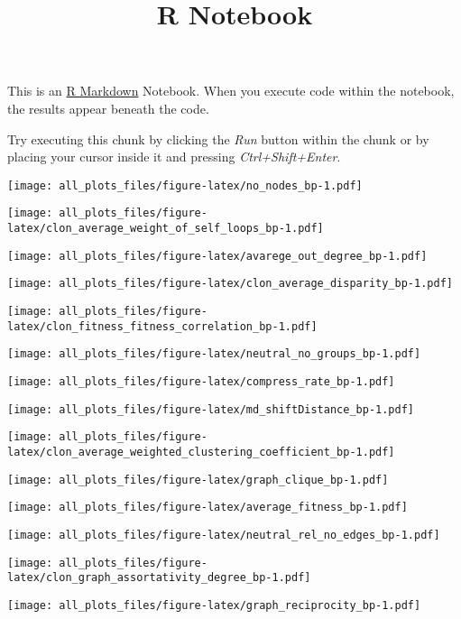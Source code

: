 \documentclass[
]{article}
\title{R Notebook}
\author{}
\date{\vspace{-2.5em}}
\begin{document}
\maketitle

This is an \href{http://rmarkdown.rstudio.com}{R Markdown} Notebook.
When you execute code within the notebook, the results appear beneath
the code.

Try executing this chunk by clicking the \emph{Run} button within the
chunk or by placing your cursor inside it and pressing
\emph{Ctrl+Shift+Enter}.

\texttt{[image: all\_plots\_files/figure-latex/no\_nodes\_bp-1.pdf]}

\texttt{[image: all\_plots\_files/figure-latex/clon\_average\_weight\_of\_self\_loops\_bp-1.pdf]}

\texttt{[image: all\_plots\_files/figure-latex/avarege\_out\_degree\_bp-1.pdf]}

\texttt{[image: all\_plots\_files/figure-latex/clon\_average\_disparity\_bp-1.pdf]}

\texttt{[image: all\_plots\_files/figure-latex/clon\_fitness\_fitness\_correlation\_bp-1.pdf]}

\texttt{[image: all\_plots\_files/figure-latex/neutral\_no\_groups\_bp-1.pdf]}

\texttt{[image: all\_plots\_files/figure-latex/compress\_rate\_bp-1.pdf]}

\texttt{[image: all\_plots\_files/figure-latex/md\_shiftDistance\_bp-1.pdf]}

\texttt{[image: all\_plots\_files/figure-latex/clon\_average\_weighted\_clustering\_coefficient\_bp-1.pdf]}

\texttt{[image: all\_plots\_files/figure-latex/graph\_clique\_bp-1.pdf]}

\texttt{[image: all\_plots\_files/figure-latex/average\_fitness\_bp-1.pdf]}

\texttt{[image: all\_plots\_files/figure-latex/neutral\_rel\_no\_edges\_bp-1.pdf]}

\texttt{[image: all\_plots\_files/figure-latex/clon\_graph\_assortativity\_degree\_bp-1.pdf]}

\texttt{[image: all\_plots\_files/figure-latex/graph\_reciprocity\_bp-1.pdf]}
\end{document}
